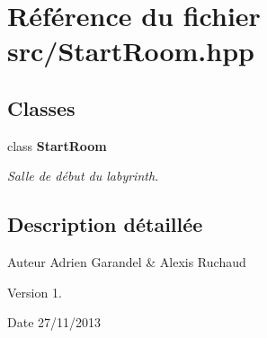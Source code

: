 \section{Référence du fichier src/\-Start\-Room.hpp}
\label{_start_room_8hpp}
\subsection*{Classes}
\begin{DoxyCompactItemize}
\item 
class {\bf Start\-Room}
\begin{DoxyCompactList}\small\item\em Salle de début du labyrinth. \end{DoxyCompactList}\end{DoxyCompactItemize}


\subsection{Description détaillée}
\begin{DoxyAuthor}{Auteur}
Adrien Garandel \& Alexis Ruchaud 
\end{DoxyAuthor}
\begin{DoxyVersion}{Version}
1. 
\end{DoxyVersion}
\begin{DoxyDate}{Date}
27/11/2013 
\end{DoxyDate}
